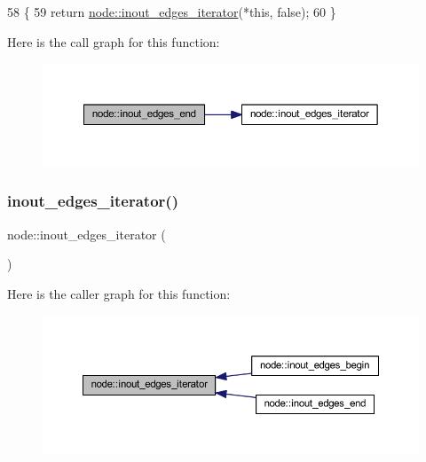\begin{DoxyCode}
58 \{
59     \textcolor{keywordflow}{return} \mbox{\hyperlink{classnode_a854d596611e6a3342090cce71cedf300}{node::inout\_edges\_iterator}}(*\textcolor{keyword}{this}, \textcolor{keyword}{false});
60 \}
\end{DoxyCode}
Here is the call graph for this function\+:\nopagebreak
\begin{figure}[H]
\begin{center}
\leavevmode
\includegraphics[width=350pt]{classnode_ad4eec3efcc3c1e572b0492276e20980c_cgraph}
\end{center}
\end{figure}
\mbox{\label{classnode_a854d596611e6a3342090cce71cedf300}} 
\subsubsection{\texorpdfstring{inout\+\_\+edges\+\_\+iterator()}{inout\_edges\_iterator()}\hspace{0.1cm}{\footnotesize\ttfamily [1/2]}}
{\footnotesize\ttfamily node\+::inout\+\_\+edges\+\_\+iterator (\begin{DoxyParamCaption}{ }\end{DoxyParamCaption})}

Here is the caller graph for this function\+:\nopagebreak
\begin{figure}[H]
\begin{center}
\leavevmode
\includegraphics[width=350pt]{classnode_a854d596611e6a3342090cce71cedf300_icgraph}
\end{center}
\end{figure}
\mbox{\label{classnode_a2990a550ae39da89f6d18e6b5faf519e}} 
